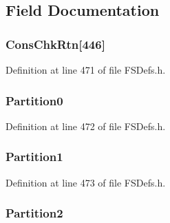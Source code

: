 \subsection{Field Documentation}
\hypertarget{struct___p_t___m_b_r_aa54045cf2751a9149d68e1cdc6fedc16}{}
\subsubsection[{Cons\+Chk\+Rtn}]{ Cons\+Chk\+Rtn\mbox{[}446\mbox{]}}\label{struct___p_t___m_b_r_aa54045cf2751a9149d68e1cdc6fedc16}


Definition at line 471 of file F\+S\+Defs.\+h.

\hypertarget{struct___p_t___m_b_r_a750fb2ef9c0ee694f27f46148c1192a0}{}
\subsubsection[{Partition0}]{ Partition0}\label{struct___p_t___m_b_r_a750fb2ef9c0ee694f27f46148c1192a0}


Definition at line 472 of file F\+S\+Defs.\+h.

\hypertarget{struct___p_t___m_b_r_afa47b00264c6cb10a3c4df5a02bd74f9}{}
\subsubsection[{Partition1}]{ Partition1}\label{struct___p_t___m_b_r_afa47b00264c6cb10a3c4df5a02bd74f9}


Definition at line 473 of file F\+S\+Defs.\+h.

\hypertarget{struct___p_t___m_b_r_a3e273f4691ec6d7bee66c8a69af0dec7}{}
\subsubsection[{Partition2}]{ Partition2}\label{struct___p_t___m_b_r_a3e273f4691ec6d7bee66c8a69af0dec7}


